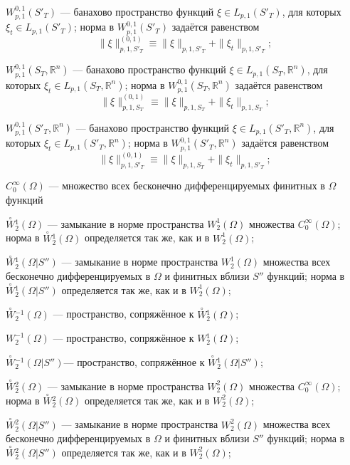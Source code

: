 \documentclass{report}
\begin{document}
$W^{0,1}_{p,1}(S'_T)$ --- банахово пространство функций $\xi\in L_{p,1}(S'_T)$, для которых $\xi_t\in L_{p,1}(S'_T)$; норма в  $W^{0,1}_{p,1}(S'_T)$ задаётся равенством
$$
\|\xi\|^{(0,1)}_{p,1,S'_T}\equiv\|\xi\|_{p,1,S'_T}+\|\xi_t\|_{p,1,S'_T};
$$

$W^{0,1}_{p,1}(S_T,\mathbb{R}^n)$ --- банахово пространство функций $\xi\in L_{p,1}(S_T,\mathbb{R}^n)$, для которых $\xi_t\in L_{p,1}(S_T,\mathbb{R}^n)$; норма в
$W^{0,1}_{p,1}(S_T,\mathbb{R}^n)$ задаётся равенством
$$
\|\xi\|^{(0,1)}_{p,1,S_T}\equiv\|\xi\|_{p,1,S_T}+\|\xi_t\|_{p,1,S_T};
$$

$W^{0,1}_{p,1}(S'_T,\mathbb{R}^n)$ --- банахово пространство функций $\xi\in L_{p,1}(S'_T,\mathbb{R}^n)$, для которых $\xi_t\in L_{p,1}(S'_T,\mathbb{R}^n)$; норма в
$W^{0,1}_{p,1}(S'_T,\mathbb{R}^n)$ задаётся равенством
$$
\|\xi\|^{(0,1)}_{p,1,S'_T}\equiv\|\xi\|_{p,1,S_T}+\|\xi_t\|_{p,1,S'_T};
$$

$C^\infty_0(\Omega)$ --- множество всех бесконечно дифференцируемых финитных в $\Omega$ функций

$\stackrel{\circ}{W}\!\!^1_2(\Omega)$ --- замыкание в норме пространства $W^1_2(\Omega)$ множества $C^\infty_0(\Omega)$; норма в $\stackrel{\circ}{W}\!\!^1_2(\Omega)$ определяется так же,
как и в $W^1_2(\Omega)$;

$\stackrel{\circ}{W}\!\!^1_2(\Omega|S'')$ --- замыкание в норме пространства $W^1_2(\Omega)$ множества всех бесконечно дифференцируемых в $\Omega$ и финитных вблизи $S''$ функций; норма в
$\stackrel{\circ}{W}\!\!^1_2(\Omega|S'')$ определяется так же, как и в $W^1_2(\Omega)$;


$\stackrel{\circ}{W}\!^{-1}_2(\Omega)$ --- пространство, сопряжённое к $\stackrel{\circ}{W}\!\!^1_2(\Omega)$;

$W^{-1}_2(\Omega)$ --- пространство, сопряжённое к $W\!^1_2(\Omega)$;

$\stackrel{\circ}{W}\!^{-1}_2(\Omega|S'')$--- пространство, сопряжённое к $\stackrel{\circ}{W}\!\!^1_2(\Omega|S'')$;


$\stackrel{\circ}{W}\!\!^2_2(\Omega)$ --- замыкание в норме пространства $W^2_2(\Omega)$ множества $C^\infty_0(\Omega)$;
норма в $\stackrel{\circ}{W}\!\!^2_2(\Omega)$ определяется так же, как и в $W^2_2(\Omega)$;

$\stackrel{\circ}{W}\!\!^2_2(\Omega|S'')$ --- замыкание в норме пространства $W^2_2(\Omega)$ множества всех бесконечно дифференцируемых в $\Omega$ и финитных вблизи $S''$ функций; норма в
$\stackrel{\circ}{W}\!\!^2_2(\Omega|S'')$ определяется так же, как и в $W^2_2(\Omega)$;
\end{document}

